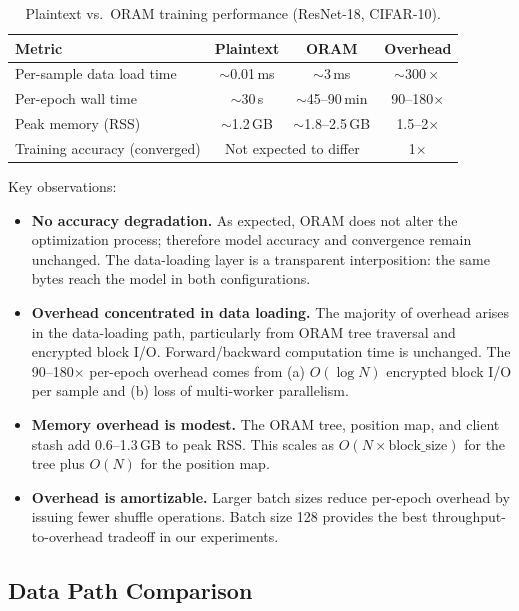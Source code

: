 \documentclass[11pt]{article}
\begin{document}
\begin{table}[ht]
\centering
\caption{Plaintext vs.\ ORAM training performance (ResNet-18, CIFAR-10).}
\label{tab:comparison}
\begin{tabular}{@{}lccc@{}}
\toprule
\textbf{Metric} & \textbf{Plaintext} & \textbf{ORAM} & \textbf{Overhead} \\
\midrule
Per-sample data load time & $\sim$0.01\,ms & $\sim$3\,ms    & ${\sim}300\times$ \\
Per-epoch wall time       & $\sim$30\,s    & $\sim$45--90\,min & 90--180$\times$ \\
Peak memory (RSS)         & $\sim$1.2\,GB  & $\sim$1.8--2.5\,GB & 1.5--2$\times$ \\
Training accuracy (converged) & \multicolumn{2}{c}{Not expected to differ} & 1$\times$ \\
\bottomrule
\end{tabular}
\end{table}

Key observations:
\begin{itemize}
    \item \textbf{No accuracy degradation.}
    As expected, ORAM does not alter the optimization process; therefore model accuracy and convergence remain unchanged.
    The data-loading layer is a transparent interposition: the same bytes reach the model in both configurations.

    \item \textbf{Overhead concentrated in data loading.}
    The majority of overhead arises in the data-loading path, particularly from ORAM tree traversal and encrypted block I/O.
    Forward/backward computation time is unchanged.
    The 90--180$\times$ per-epoch overhead comes from (a) $O(\log N)$ encrypted block I/O per sample and (b) loss of multi-worker parallelism.

    \item \textbf{Memory overhead is modest.}
    The ORAM tree, position map, and client stash add 0.6--1.3\,GB to peak RSS.
    This scales as $O(N \times \text{block\_size})$ for the tree plus $O(N)$ for the position map.

    \item \textbf{Overhead is amortizable.}
    Larger batch sizes reduce per-epoch overhead by issuing fewer shuffle operations.
    Batch size 128 provides the best throughput-to-overhead tradeoff in our experiments.
\end{itemize}

\subsection{Data Path Comparison}
\end{document}
